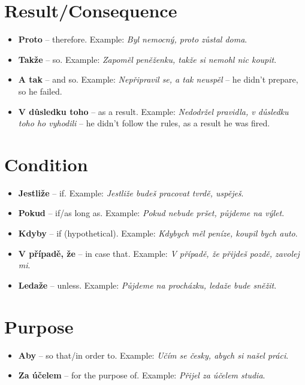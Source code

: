 \documentclass[12pt]{book}
\begin{document}
\section{Result/Consequence}
\begin{itemize}
    \item \textbf{Proto} -- therefore. Example: \emph{Byl nemocný, proto zůstal doma}.
    \item \textbf{Takže} -- so. Example: \emph{Zapoměl peněženku, takže si nemohl nic koupit}.
    \item \textbf{A tak} -- and so. Example: \emph{Nepřipravil se, a tak neuspěl} -- he didn't prepare, so he failed.
    \item \textbf{V důsledku toho} -- as a result. Example: \emph{Nedodržel pravidla, v důsledku toho ho vyhodili} --
        he didn't follow the rules, as a result he was fired.
\end{itemize}

\section{Condition}
\begin{itemize}
    \item \textbf{Jestliže} -- if. Example: \emph{Jestliže budeš pracovat tvrdě, uspěješ}.
    \item \textbf{Pokud} -- if/as long as. Example: \emph{Pokud nebude pršet, půjdeme na výlet}.
    \item \textbf{Kdyby} -- if (hypothetical). Example: \emph{Kdybych měl peníze, koupil bych auto}.
    \item \textbf{V případě, že} -- in case that. Example: \emph{V případě, že přijdeš pozdě, zavolej mi}.
    \item \textbf{Ledaže} -- unless. Example: \emph{Půjdeme na procházku, ledaže bude sněžit}.
\end{itemize}

\section{Purpose}
\begin{itemize}
    \item \textbf{Aby} -- so that/in order to. Example: \emph{Učím se česky, abych si našel práci}.
    \item \textbf{Za účelem} -- for the purpose of. Example: \emph{Přijel za účelem studia}.
\end{itemize}
\end{document}
